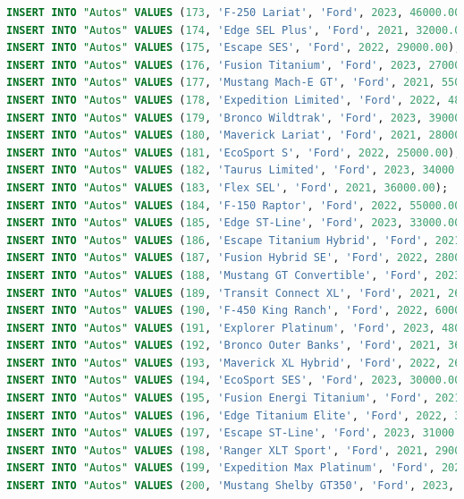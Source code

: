 \documentclass[12pt]{article}
\begin{document}
\begin{lstlisting}[language=SQL]
INSERT INTO "Autos" VALUES (173, 'F-250 Lariat', 'Ford', 2023, 46000.00);
INSERT INTO "Autos" VALUES (174, 'Edge SEL Plus', 'Ford', 2021, 32000.00);
INSERT INTO "Autos" VALUES (175, 'Escape SES', 'Ford', 2022, 29000.00);
INSERT INTO "Autos" VALUES (176, 'Fusion Titanium', 'Ford', 2023, 27000.00);
INSERT INTO "Autos" VALUES (177, 'Mustang Mach-E GT', 'Ford', 2021, 55000.00);
INSERT INTO "Autos" VALUES (178, 'Expedition Limited', 'Ford', 2022, 48000.00);
INSERT INTO "Autos" VALUES (179, 'Bronco Wildtrak', 'Ford', 2023, 39000.00);
INSERT INTO "Autos" VALUES (180, 'Maverick Lariat', 'Ford', 2021, 28000.00);
INSERT INTO "Autos" VALUES (181, 'EcoSport S', 'Ford', 2022, 25000.00);
INSERT INTO "Autos" VALUES (182, 'Taurus Limited', 'Ford', 2023, 34000.00);
INSERT INTO "Autos" VALUES (183, 'Flex SEL', 'Ford', 2021, 36000.00);
INSERT INTO "Autos" VALUES (184, 'F-150 Raptor', 'Ford', 2022, 55000.00);
INSERT INTO "Autos" VALUES (185, 'Edge ST-Line', 'Ford', 2023, 33000.00);
INSERT INTO "Autos" VALUES (186, 'Escape Titanium Hybrid', 'Ford', 2021, 32000.00);
INSERT INTO "Autos" VALUES (187, 'Fusion Hybrid SE', 'Ford', 2022, 28000.00);
INSERT INTO "Autos" VALUES (188, 'Mustang GT Convertible', 'Ford', 2023, 49000.00);
INSERT INTO "Autos" VALUES (189, 'Transit Connect XL', 'Ford', 2021, 26000.00);
INSERT INTO "Autos" VALUES (190, 'F-450 King Ranch', 'Ford', 2022, 60000.00);
INSERT INTO "Autos" VALUES (191, 'Explorer Platinum', 'Ford', 2023, 48000.00);
INSERT INTO "Autos" VALUES (192, 'Bronco Outer Banks', 'Ford', 2021, 36000.00);
INSERT INTO "Autos" VALUES (193, 'Maverick XL Hybrid', 'Ford', 2022, 26000.00);
INSERT INTO "Autos" VALUES (194, 'EcoSport SES', 'Ford', 2023, 30000.00);
INSERT INTO "Autos" VALUES (195, 'Fusion Energi Titanium', 'Ford', 2021, 32000.00);
INSERT INTO "Autos" VALUES (196, 'Edge Titanium Elite', 'Ford', 2022, 38000.00);
INSERT INTO "Autos" VALUES (197, 'Escape ST-Line', 'Ford', 2023, 31000.00);
INSERT INTO "Autos" VALUES (198, 'Ranger XLT Sport', 'Ford', 2021, 29000.00);
INSERT INTO "Autos" VALUES (199, 'Expedition Max Platinum', 'Ford', 2022, 52000.00);
INSERT INTO "Autos" VALUES (200, 'Mustang Shelby GT350', 'Ford', 2023, 62000.00);


\end{lstlisting}
\end{document}
